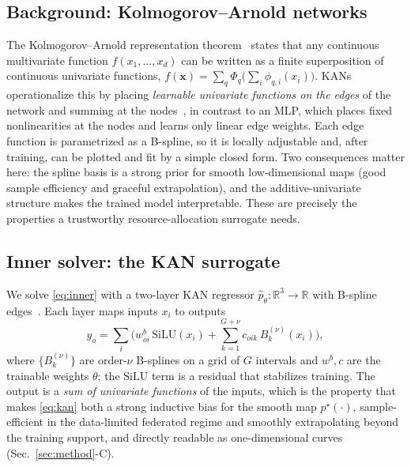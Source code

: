 \documentclass[journal]{IEEEtran}
\newcommand{\pstar}{p^{\star}}
\begin{document}
\subsection{Background: Kolmogorov--Arnold networks}
The Kolmogorov--Arnold representation theorem~\cite{kolmogorov1957} states that any
continuous multivariate function $f(x_1,\dots,x_d)$ can be written as a finite
superposition of continuous univariate functions,
$f(\mathbf x)=\sum_{q}\Phi_q\!\big(\sum_{i}\phi_{q,i}(x_i)\big)$. KANs operationalize
this by placing \emph{learnable univariate functions on the edges} of the network
and summing at the nodes~\cite{liu2024kan}, in contrast to an MLP, which places
fixed nonlinearities at the nodes and learns only linear edge weights. Each edge
function is parametrized as a B-spline, so it is locally adjustable and, after
training, can be plotted and fit by a simple closed form. Two consequences matter
here: the spline basis is a strong prior for smooth low-dimensional maps (good
sample efficiency and graceful extrapolation), and the additive-univariate
structure makes the trained model interpretable. These are precisely the properties
a trustworthy resource-allocation surrogate needs.

\subsection{Inner solver: the KAN surrogate}
We solve \eqref{eq:inner} with a two-layer KAN regressor
$\hat p_\theta:\mathbb R^3\!\to\!\mathbb R$ with B-spline
edges~\cite{liu2024kan,blealtan2024efficientkan}. Each layer maps inputs $x_i$ to
outputs
\begin{equation}
y_o=\sum_i\Big(w^{b}_{oi}\,\mathrm{SiLU}(x_i)+\sum_{k=1}^{G+\nu} c_{oik}\,B_{k}^{(\nu)}(x_i)\Big),
\label{eq:kan}
\end{equation}
where $\{B_k^{(\nu)}\}$ are order-$\nu$ B-splines on a grid of $G$ intervals and
$w^b,c$ are the trainable weights $\theta$; the $\mathrm{SiLU}$ term is a residual
that stabilizes training. The output is a \emph{sum of univariate functions} of the
inputs, which is the property that makes \eqref{eq:kan} both a strong inductive bias
for the smooth map $\pstar(\cdot)$, sample-efficient in the data-limited federated
regime and smoothly extrapolating beyond the training support, and directly
readable as one-dimensional curves (Sec.~\ref{sec:method}-C).
\end{document}
